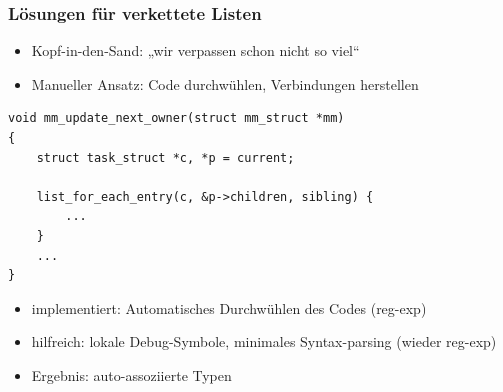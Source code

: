 \documentclass[german]{beamer}
\begin{document}

\begin{frame}[fragile]
\frametitle{Lösungen für verkettete Listen}
  \begin{itemize}
	\item Kopf-in-den-Sand: „wir verpassen schon nicht so viel“
        \item Manueller Ansatz: Code durchwühlen, Verbindungen herstellen
  \end{itemize}
\begin{lstlisting}[frame=single,caption=Linked lists referencing other types (excerpt from kernel/exit.c),label=lst:linkedliststypes]
void mm_update_next_owner(struct mm_struct *mm)
{
    struct task_struct *c, *p = current;

    list_for_each_entry(c, &p->children, sibling) {
        ...
    }
    ...
}
\end{lstlisting}
  \begin{itemize}
	\item implementiert: Automatisches Durchwühlen des Codes (reg-exp)
        \item hilfreich: lokale Debug-Symbole, minimales Syntax-parsing (wieder reg-exp)
        \item Ergebnis: auto-assoziierte Typen
  \end{itemize}
\end{frame}
\end{document}
